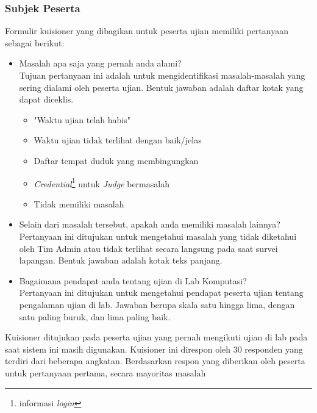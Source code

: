     \subsubsection{Subjek Peserta}
    Formulir kuisioner yang dibagikan untuk peserta ujian memiliki pertanyaan
    sebagai berikut:
    \begin{itemize}
        \item Masalah apa saja yang pernah anda alami?\\
            Tujuan pertanyaan ini adalah untuk mengidentifikasi masalah-masalah
            yang sering dialami oleh peserta ujian. Bentuk jawaban adalah daftar
            kotak yang dapat diceklis.
            \begin{itemize}
                \item "Waktu ujian telah habis"
                \item Waktu ujian tidak terlihat dengan baik/jelas
                \item Daftar tempat duduk yang membingungkan
                \item \textit{Credential}\footnote{informasi \textit{login}}
                untuk \textit{Judge} bermasalah
                \item Tidak memiliki masalah
            \end{itemize}
            
        \item Selain dari masalah tersebut, apakah anda memiliki masalah
        lainnya?\\
            Pertanyaan ini ditujukan untuk mengetahui masalah yang tidak
            diketahui oleh Tim Admin atau tidak terlihat secara langsung pada
            saat survei lapangan. Bentuk jawaban adalah kotak teks panjang.
            
        \item Bagaimana pendapat anda tentang ujian di Lab Komputasi?\\
            Pertanyaan ini ditujukan untuk mengetahui pendapat peserta ujian
            tentang pengalaman ujian di lab. Jawaban berupa skala satu hingga
            lima, dengan satu paling buruk, dan lima paling baik.
            
    \end{itemize}
    Kuisioner ditujukan pada peserta ujian yang pernah mengikuti ujian di lab
    pada saat sistem ini masih digunakan. Kuisioner ini direspon oleh 30
    responden yang terdiri dari beberapa angkatan. Berdasarkan respon yang
    diberikan oleh peserta untuk pertanyaan pertama, secara mayoritas masalah
